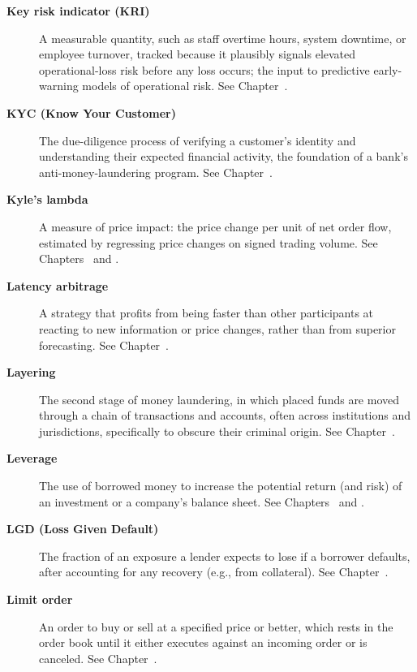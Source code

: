 \documentclass[../ai_in_finance]{subfiles}
\begin{document}
\begin{description}
\item[\textbf{Key risk indicator (KRI)}] A measurable quantity, such as staff overtime hours, system downtime, or employee turnover, tracked because it plausibly signals elevated operational-loss risk before any loss occurs; the input to predictive early-warning models of operational risk. See Chapter~.

\item[\textbf{KYC (Know Your Customer)}] The due-diligence process of verifying a customer's identity and understanding their expected financial activity, the foundation of a bank's anti-money-laundering program. See Chapter~.

\item[\textbf{Kyle's lambda}] A measure of price impact: the price change per unit of net order flow, estimated by regressing price changes on signed trading volume. See Chapters~ and .

\item[\textbf{Latency arbitrage}] A strategy that profits from being faster than other participants at reacting to new information or price changes, rather than from superior forecasting. See Chapter~.

\item[\textbf{Layering}] The second stage of money laundering, in which placed funds are moved through a chain of transactions and accounts, often across institutions and jurisdictions, specifically to obscure their criminal origin. See Chapter~.

\item[\textbf{Leverage}] The use of borrowed money to increase the potential return (and risk) of an investment or a company's balance sheet. See Chapters~ and .

\item[\textbf{LGD (Loss Given Default)}] The fraction of an exposure a lender expects to lose if a borrower defaults, after accounting for any recovery (e.g., from collateral). See Chapter~.

\item[\textbf{Limit order}] An order to buy or sell at a specified price or better, which rests in the order book until it either executes against an incoming order or is canceled. See Chapter~.


\end{description}
\end{document}
